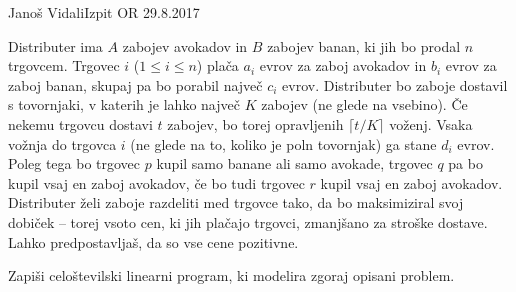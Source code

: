 \begin{naloga}{Janoš Vidali}{Izpit OR 29.8.2017}
\begin{vprasanje}
Distributer ima $A$ zabojev avokadov in $B$ zabojev banan,
ki jih bo prodal $n$ trgovcem.
Trgovec $i$ ($1 \le i \le n$)
plača $a_i$ evrov za zaboj avokadov in $b_i$ evrov za zaboj banan,
skupaj pa bo porabil največ $c_i$ evrov.
Distributer bo zaboje dostavil s tovornjaki,
v katerih je lahko največ $K$ zabojev (ne glede na vsebino).
Če nekemu trgovcu dostavi $t$ zabojev,
bo torej opravljenih $\lceil t/K \rceil$ voženj.
Vsaka vožnja do trgovca $i$ (ne glede na to, koliko je poln tovornjak)
ga stane $d_i$ evrov.
Poleg tega bo trgovec $p$ kupil samo banane ali samo avokade,
trgovec $q$ pa bo kupil vsaj en zaboj avokadov,
če bo tudi trgovec $r$ kupil vsaj en zaboj avokadov.
Distributer želi zaboje razdeliti med trgovce tako,
da bo maksimiziral svoj dobiček
-- torej vsoto cen, ki jih plačajo trgovci,
zmanjšano za stroške dostave.
Lahko predpostavljaš, da so vse cene pozitivne.

Zapiši celoštevilski linearni program, ki modelira zgoraj opisani problem.
\end{vprasanje}
\begin{odgovor}
\end{odgovor}
\end{naloga}
